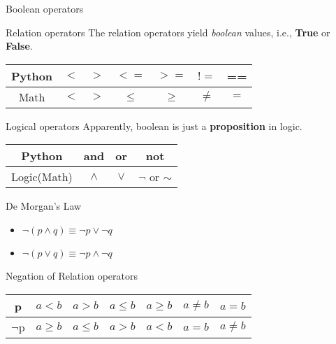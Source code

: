 \documentclass[aspectratio=43]{beamer}
\begin{document}
\begin{frame}{Boolean operators}
    \begin{block}{Relation operators}
        The relation operators yield \textit{boolean} values, i.e., \textbf{True} or \textbf{False}.
        \begin{center}
            \begin{tabular}{|c|c|c|c|c|c|c|}
                \hline
                Python & $<$ & $>$ & $<=$  & $>=$  & $!=$  & ==  \\
                \hline
                Math   & $<$ & $>$ & $\le$ & $\ge$ & $\ne$ & $=$ \\
                \hline
            \end{tabular}
        \end{center}
    \end{block}

    \begin{block}{Logical operators}
        Apparently, boolean is just a \textbf{proposition} in logic.
        \begin{center}
            \begin{tabular}{|c|c|c|c|}
                \hline
                Python      & \textbf{and} & \textbf{or} & \textbf{not}     \\
                \hline
                Logic(Math) & $\land$      & $\lor$      & $\neg$ or $\sim$ \\
                \hline
            \end{tabular}
        \end{center}
    \end{block}

\end{frame}

\begin{frame}
    \begin{block}{De Morgan's Law}
        \begin{itemize}
            \item $\neg(p \land q) \equiv \neg p \lor \neg q$
            \item $\neg(p \lor q) \equiv \neg p \land \neg q$
        \end{itemize}
    \end{block}
    \begin{block}{Negation of Relation operators}
        \begin{center}
            \begin{tabular}{|c|c|c|c|c|c|c|}
                \hline
                p       & $a<b$    & $a>b$    & $a \le b$ & $a\ge b$ & $a\ne b$ & $a=b$    \\
                \hline
                $\neg$p & $a\ge b$ & $a\le b$ & $a>b$     & $a<b$    & $a=b$    & $a\ne b$ \\
                \hline
            \end{tabular}
        \end{center}
    \end{block}
\end{frame}
\end{document}
